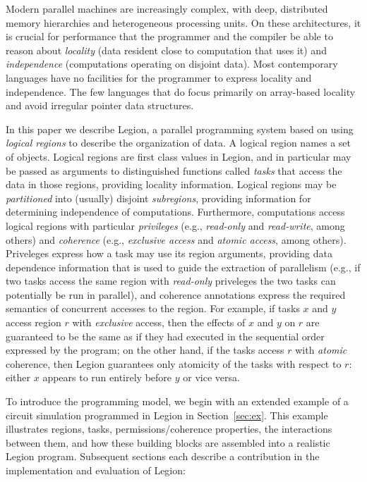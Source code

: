 \documentclass[conference]{IEEEtran}
\begin{document}
Modern parallel machines are increasingly complex, with deep,
distributed memory hierarchies and heterogeneous processing units.  On
these architectures, it is crucial for performance that the programmer
and the compiler be able to reason about {\em locality} (data resident
close to computation that uses it) and {\em independence} (computations
operating on disjoint data).  Most contemporary
languages have no facilities for the programmer to express locality
and independence.  The few languages that do focus primarily on
array-based locality \cite{Fatahalian06,CHAPEL04,UPC99} and 
avoid irregular pointer data structures.

In this paper we describe Legion, a parallel programming system based
on using {\em logical regions} to describe the organization of data.
A logical region names a set of objects.  Logical regions are first
class values in Legion, and in particular may be passed as arguments
to distinguished functions called {\em tasks} that access the data in those regions, providing locality
information.  Logical regions may be {\em partitioned} into (usually)
disjoint {\em subregions}, providing information for determining independence of computations.  Furthermore,
computations access logical regions with particular {\em privileges} (e.g., {\em
  read-only} and {\em read-write}, among others) 
and {\em coherence} (e.g., {\em exclusive access} and {\em atomic access}, among others).
Priveleges express how a task may use its region arguments, providing data dependence information
that is used to guide the extraction of parallelism (e.g., if two tasks access the same region with
{\em read-only} priveleges the two tasks can potentially be run in parallel), and coherence annotations
express the required semantics of concurrent accesses to the region.  For example, if tasks $x$ and $y$ access region $r$
with {\em exclusive} access, then the effects of $x$ and $y$ on $r$ are guaranteed to be the same as if they had executed
in the sequential order expressed by the program; on the other hand, if the tasks access $r$ with {\em atomic} coherence, then 
Legion guarantees only  atomicity of the tasks with respect to $r$: either $x$ appears to run entirely before $y$ or vice versa.

To introduce the programming model, we begin with an extended example of a circuit simulation programmed in Legion
in Section~\ref{sec:ex}. This example illustrates regions, tasks, permissions/coherence properties, the interactions
between them, and how these building blocks are assembled into a realistic Legion program.   Subsequent sections each
describe a contribution in the implementation and evaluation of Legion: 
 
\end{document}
